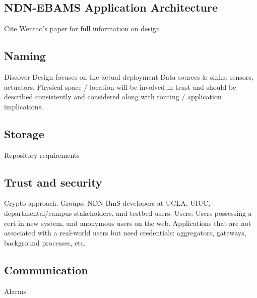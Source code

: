\subsection{NDN-EBAMS   Application Architecture} 
 
 Cite Wentao's paper for full information on design
 
 
 
 
\subsection{Naming}
Discover
Design focuses on the actual deployment
Data sources \& sinks:  sensors, actuators.
Physical space / location will be involved in trust and should be described consistently and considered along with routing / application implications.
\subsection{Storage}
Repository requirements
\subsection{Trust and security}
Crypto approach.
Groups: NDN-BmS developers at UCLA, UIUC, departmental/campus stakeholders, and testbed users. 
Users:  Users possessing a cert in new system, and anonymous users on the web.
Applications that are not associated with a real-world users but need credentials: aggregators, gateways, background processes, etc. 

\subsection{Communication}
Alarms

